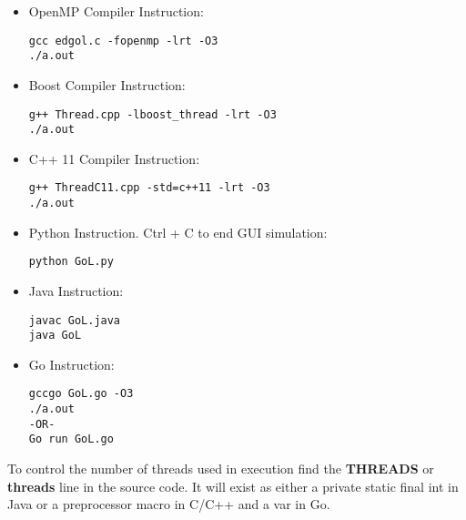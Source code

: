 \begin{itemize}
\item OpenMP Compiler Instruction:
\begin{verbatim}
gcc edgol.c -fopenmp -lrt -O3 
./a.out
\end{verbatim}
\item Boost Compiler Instruction:
\begin{verbatim}
g++ Thread.cpp -lboost_thread -lrt -O3
./a.out
\end{verbatim}
\item C++ 11 Compiler Instruction:
\begin{verbatim}
g++ ThreadC11.cpp -std=c++11 -lrt -O3
./a.out
\end{verbatim}
\item Python Instruction. Ctrl + C to end GUI simulation:
\begin{verbatim}
python GoL.py
\end{verbatim}
\item Java Instruction:
\begin{verbatim}
javac GoL.java
java GoL
\end{verbatim}
\item Go Instruction:
\begin{verbatim} 
gccgo GoL.go -O3
./a.out
-OR-
Go run GoL.go
\end{verbatim} 
\end{itemize}
To control the number of threads used in execution find the {\bf THREADS} or {\bf threads} line in the source code. It will exist as either a private static final int in Java or a preprocessor macro in C/C++ and a var in Go.